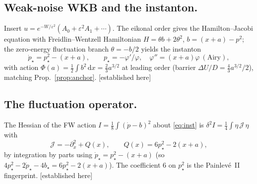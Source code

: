 \documentclass[11pt,reqno]{amsart}
\theoremstyle{plain}
\theoremstyle{definition}
\theoremstyle{remark}
\newcommand{\dd}{\,\mathrm{d}}
\newcommand{\eps}{\varepsilon}
\newcommand{\pinst}{p_\star}
\newcommand{\tagPr}{{\footnotesize\textsf{[established here]}}}
\begin{document}
\subsection{Weak-noise WKB and the instanton.}
Insert $u=e^{-W/\eps^2}(A_0+\eps^2 A_1+\cdots)$. The eikonal order gives the Hamilton--Jacobi
equation with Freidlin--Wentzell Hamiltonian $H=\theta b+2\theta^2$, $b=(x+a)-p^2$; the
zero-energy fluctuation branch $\theta=-b/2$ yields the instanton
\begin{equation}\label{eq:inst}
\dot\pinst=\pinst^2-(x+a),\qquad \pinst=-\varphi'/\varphi,\quad \varphi''=(x+a)\varphi\ (\text{Airy}),
\end{equation}
with action $\Phi(a)=\tfrac12\int b^2\dd x=\tfrac23 a^{3/2}$ at leading order (barrier
$\Delta U/D=\tfrac43a^{3/2}/2$), matching Prop.~\ref{prop:anchor}. \tagPr

\subsection{The fluctuation operator.}
The Hessian of the FW action $I=\tfrac18\int(\dot p-b)^2$ about \eqref{eq:inst} is
$\delta^2 I=\tfrac14\int\eta\,\mathcal J\,\eta$ with
\begin{equation}\label{eq:jacobi}
\mathcal J=-\partial_x^2+Q(x),\qquad Q(x)=6\pinst^2-2(x+a),
\end{equation}
by integration by parts using $\dot\pinst=\pinst^2-(x+a)$ (so
$4\pinst^2-2\dot\pinst-4b_\star=6\pinst^2-2(x+a)$). The coefficient $6$ on $\pinst^2$ is the
Painlev\'e~II fingerprint. \tagPr
\end{document}
